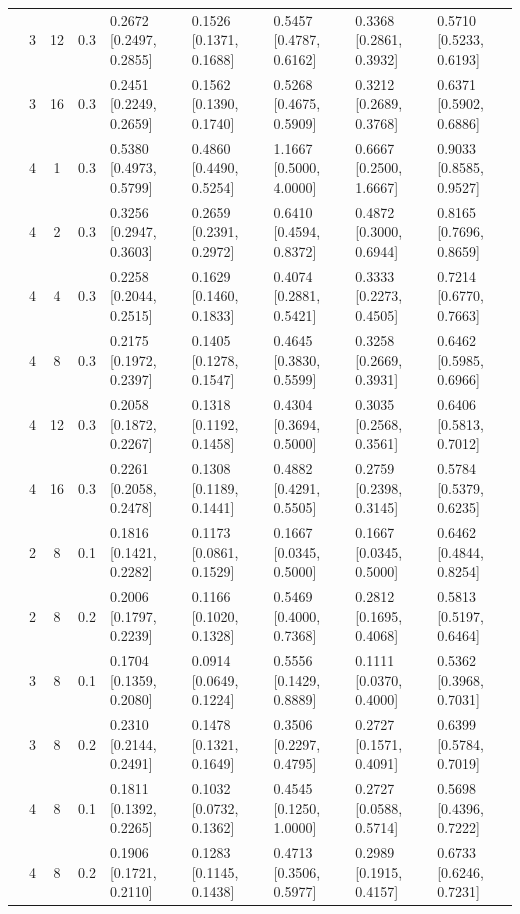 \begin{tabular}{@{}cccclllll@{}}
 & 3 & 12 & 0.3 & 0.2672 {\tiny[0.2497, 0.2855]} & 0.1526 {\tiny[0.1371, 0.1688]} & 0.5457 {\tiny[0.4787, 0.6162]} & 0.3368 {\tiny[0.2861, 0.3932]} & 0.5710 {\tiny[0.5233, 0.6193]} \\
 & 3 & 16 & 0.3 & 0.2451 {\tiny[0.2249, 0.2659]} & 0.1562 {\tiny[0.1390, 0.1740]} & 0.5268 {\tiny[0.4675, 0.5909]} & 0.3212 {\tiny[0.2689, 0.3768]} & 0.6371 {\tiny[0.5902, 0.6886]} \\
 & 4 & 1 & 0.3 & 0.5380 {\tiny[0.4973, 0.5799]} & 0.4860 {\tiny[0.4490, 0.5254]} & 1.1667 {\tiny[0.5000, 4.0000]} & 0.6667 {\tiny[0.2500, 1.6667]} & 0.9033 {\tiny[0.8585, 0.9527]} \\
 & 4 & 2 & 0.3 & 0.3256 {\tiny[0.2947, 0.3603]} & 0.2659 {\tiny[0.2391, 0.2972]} & 0.6410 {\tiny[0.4594, 0.8372]} & 0.4872 {\tiny[0.3000, 0.6944]} & 0.8165 {\tiny[0.7696, 0.8659]} \\
 & 4 & 4 & 0.3 & 0.2258 {\tiny[0.2044, 0.2515]} & 0.1629 {\tiny[0.1460, 0.1833]} & 0.4074 {\tiny[0.2881, 0.5421]} & 0.3333 {\tiny[0.2273, 0.4505]} & 0.7214 {\tiny[0.6770, 0.7663]} \\
 & 4 & 8 & 0.3 & 0.2175 {\tiny[0.1972, 0.2397]} & 0.1405 {\tiny[0.1278, 0.1547]} & 0.4645 {\tiny[0.3830, 0.5599]} & 0.3258 {\tiny[0.2669, 0.3931]} & 0.6462 {\tiny[0.5985, 0.6966]} \\
 & 4 & 12 & 0.3 & 0.2058 {\tiny[0.1872, 0.2267]} & 0.1318 {\tiny[0.1192, 0.1458]} & 0.4304 {\tiny[0.3694, 0.5000]} & 0.3035 {\tiny[0.2568, 0.3561]} & 0.6406 {\tiny[0.5813, 0.7012]} \\
 & 4 & 16 & 0.3 & 0.2261 {\tiny[0.2058, 0.2478]} & 0.1308 {\tiny[0.1189, 0.1441]} & 0.4882 {\tiny[0.4291, 0.5505]} & 0.2759 {\tiny[0.2398, 0.3145]} & 0.5784 {\tiny[0.5379, 0.6235]} \\
 & 2 & 8 & 0.1 & 0.1816 {\tiny[0.1421, 0.2282]} & 0.1173 {\tiny[0.0861, 0.1529]} & 0.1667 {\tiny[0.0345, 0.5000]} & 0.1667 {\tiny[0.0345, 0.5000]} & 0.6462 {\tiny[0.4844, 0.8254]} \\
 & 2 & 8 & 0.2 & 0.2006 {\tiny[0.1797, 0.2239]} & 0.1166 {\tiny[0.1020, 0.1328]} & 0.5469 {\tiny[0.4000, 0.7368]} & 0.2812 {\tiny[0.1695, 0.4068]} & 0.5813 {\tiny[0.5197, 0.6464]} \\
 & 3 & 8 & 0.1 & 0.1704 {\tiny[0.1359, 0.2080]} & 0.0914 {\tiny[0.0649, 0.1224]} & 0.5556 {\tiny[0.1429, 0.8889]} & 0.1111 {\tiny[0.0370, 0.4000]} & 0.5362 {\tiny[0.3968, 0.7031]} \\
 & 3 & 8 & 0.2 & 0.2310 {\tiny[0.2144, 0.2491]} & 0.1478 {\tiny[0.1321, 0.1649]} & 0.3506 {\tiny[0.2297, 0.4795]} & 0.2727 {\tiny[0.1571, 0.4091]} & 0.6399 {\tiny[0.5784, 0.7019]} \\
 & 4 & 8 & 0.1 & 0.1811 {\tiny[0.1392, 0.2265]} & 0.1032 {\tiny[0.0732, 0.1362]} & 0.4545 {\tiny[0.1250, 1.0000]} & 0.2727 {\tiny[0.0588, 0.5714]} & 0.5698 {\tiny[0.4396, 0.7222]} \\
 & 4 & 8 & 0.2 & 0.1906 {\tiny[0.1721, 0.2110]} & 0.1283 {\tiny[0.1145, 0.1438]} & 0.4713 {\tiny[0.3506, 0.5977]} & 0.2989 {\tiny[0.1915, 0.4157]} & 0.6733 {\tiny[0.6246, 0.7231]} \\
\bottomrule
\end{tabular}
